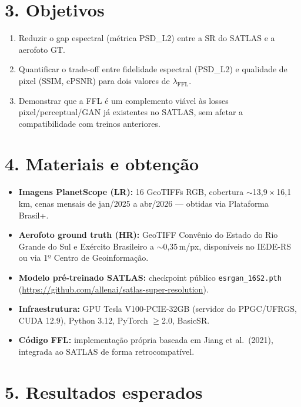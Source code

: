 \documentclass[12pt, a4paper]{article}
\begin{document}
\section*{3. Objetivos}

\begin{enumerate}[leftmargin=*, topsep=2pt, itemsep=1pt]
    \item Reduzir o gap espectral (métrica PSD\_L2) entre a SR do SATLAS e a aerofoto GT.
    \item Quantificar o trade-off entre fidelidade espectral (PSD\_L2) e qualidade de pixel
          (SSIM, cPSNR) para dois valores de $\lambda_{\text{FFL}}$.
    \item Demonstrar que a FFL é um complemento viável às losses pixel/perceptual/GAN já
          existentes no SATLAS, sem afetar a compatibilidade com treinos anteriores.
\end{enumerate}

\section*{4. Materiais e obtenção}

\begin{itemize}[leftmargin=*, topsep=2pt, itemsep=1pt]
    \item \textbf{Imagens PlanetScope (LR):} 16 GeoTIFFs RGB, cobertura $\sim$13,9\,$\times$\,16,1\,km,
          cenas mensais de jan/2025 a abr/2026 --- obtidas via Plataforma Brasil+.
    \item \textbf{Aerofoto ground truth (HR):} GeoTIFF Convênio do Estado do Rio Grande do Sul e Exército Brasileiro a $\sim$0,35\,m/px, disponíveis no IEDE-RS ou via 1º Centro de Geoinformação.
    \item \textbf{Modelo pré-treinado SATLAS:} checkpoint público \texttt{esrgan\_16S2.pth}
          (\url{https://github.com/allenai/satlas-super-resolution}).
    \item \textbf{Infraestrutura:} GPU Tesla V100-PCIE-32GB (servidor do PPGC/UFRGS,
          CUDA 12.9), Python 3.12, PyTorch $\geq$2.0, BasicSR.
    \item \textbf{Código FFL:} implementação própria baseada em Jiang et al.\ (2021),
          integrada ao SATLAS de forma retrocompatível.
\end{itemize}

\section*{5. Resultados esperados}
\end{document}
